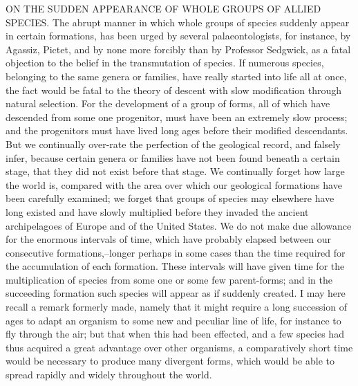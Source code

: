 ON THE SUDDEN APPEARANCE OF WHOLE GROUPS OF ALLIED SPECIES.
The abrupt manner in which whole groups of species suddenly appear in certain formations, has been urged by several palaeontologists, for instance, by Agassiz, Pictet, and by none more forcibly than by Professor Sedgwick, as a fatal objection to the belief in the transmutation of species. If numerous species, belonging to the same genera or families, have really started into life all at once, the fact would be fatal to the theory of descent with slow modification through natural selection. For the development of a group of forms, all of which have descended from some one progenitor, must have been an extremely slow process; and the progenitors must have lived long ages before their modified descendants. But we continually over-rate the perfection of the geological record, and falsely infer, because certain genera or families have not been found beneath a certain stage, that they did not exist before that stage. We continually forget how large the world is, compared with the area over which our geological formations have been carefully examined; we forget that groups of species may elsewhere have long existed and have slowly multiplied before they invaded the ancient archipelagoes of Europe and of the United States. We do not make due allowance for the enormous intervals of time, which have probably elapsed between our consecutive formations,--longer perhaps in some cases than the time required for the accumulation of each formation. These intervals will have given time for the multiplication of species from some one or some few parent-forms; and in the succeeding formation such species will appear as if suddenly created.
I may here recall a remark formerly made, namely that it might require a long succession of ages to adapt an organism to some new and peculiar line of life, for instance to fly through the air; but that when this had been effected, and a few species had thus acquired a great advantage over other organisms, a comparatively short time would be necessary to produce many divergent forms, which would be able to spread rapidly and widely throughout the world.
